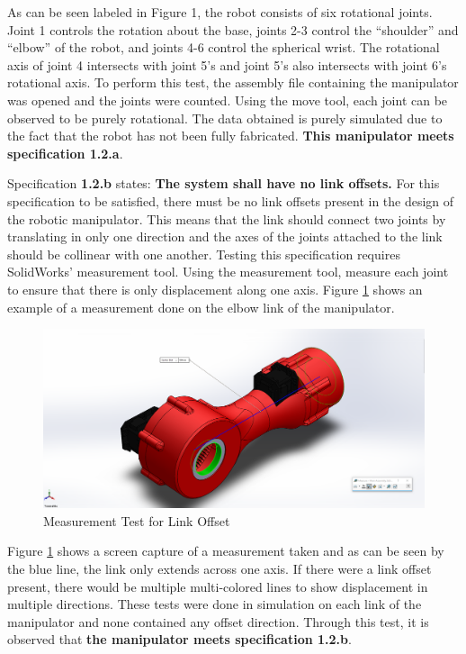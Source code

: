\documentclass[12pt]{report}
\begin{document}
As can be seen labeled in Figure 1, the robot consists of six rotational joints. Joint 1 controls the rotation about the base,  joints 2-3 control the “shoulder” and “elbow” of the robot, and joints 4-6 control the  spherical wrist. The rotational axis of joint 4 intersects with joint 5’s and joint 5’s also intersects with joint 6’s rotational axis. To perform this test, the assembly file containing the manipulator was opened and the joints were counted. Using the move tool, each joint can be observed to be purely rotational. The data obtained is purely simulated due to the fact that the robot has not been fully fabricated. \textbf{This manipulator meets specification 1.2.a}.

Specification \textbf{1.2.b} states: \textbf{The system shall have no link offsets.} For this specification to be satisfied, there must be no link offsets present in the design of the robotic manipulator. This means that the link should connect two joints by translating in only one direction and the axes of the joints attached to the link should be collinear with one another. Testing this specification requires SolidWorks’ measurement tool. Using the measurement tool, measure each joint to ensure that there is only displacement along one axis. Figure \ref{fig:loff} shows an example of a measurement done on the elbow link of the manipulator.

\begin{figure}[htp]
  \centering
  \includegraphics[width=.75\textwidth,frame]{loff}
  \caption{Measurement Test for Link Offset}
  \label{fig:loff}
\end{figure}

Figure \ref{fig:loff} shows a screen capture of a measurement taken and as can be seen by the blue line, the link only extends across one axis. If there were a link offset present, there would be multiple multi-colored lines to show displacement in multiple directions. These tests were done in simulation on each link of the manipulator and none contained any offset direction. Through this test, it is observed that \textbf{the manipulator meets specification 1.2.b}.
\end{document}
